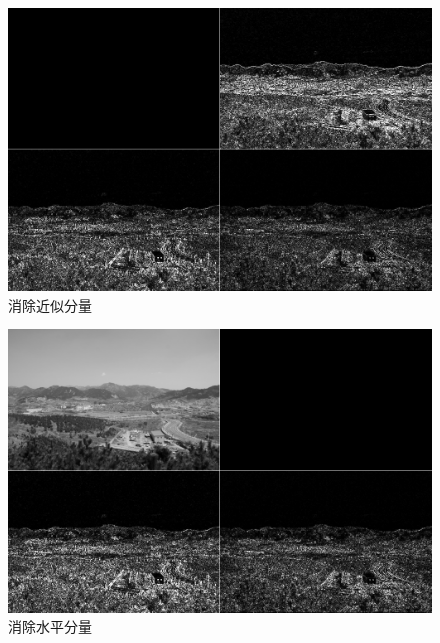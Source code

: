 \documentclass[UTF8]{ctexart}
\begin{document}
             			\begin{figure}[H]
             				\centering 
             				\includegraphics[scale=0.25]{n_eq_1_cut.png} 
             				\caption{消除近似分量} 
             				\label{remove_a}
             			\end{figure}
                         
             			\begin{figure}[H]
             				\centering 
             				\includegraphics[scale=0.25]{n_eq_1_cut_h.png} 
             				\caption{消除水平分量} 
             				\label{remove_h}
             			\end{figure}                                          
\end{document}
